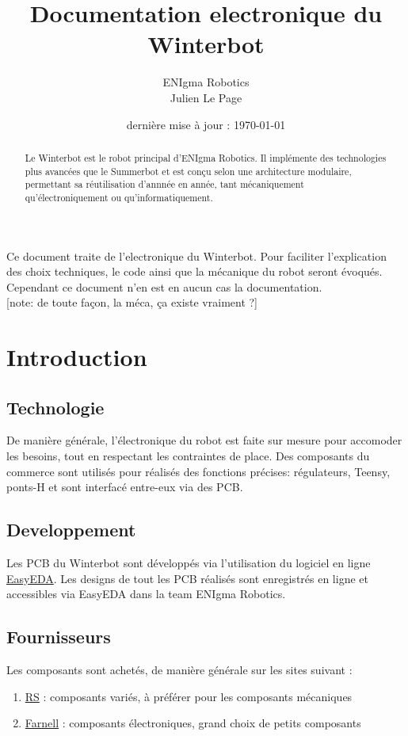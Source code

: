 \documentclass[a4paper,10pt]{refart}
\title{Documentation electronique du Winterbot}
\author{ENIgma Robotics \\ Julien Le Page}
\date{dernière mise à jour : \today}
\begin{document}
\maketitle

\begin{abstract}
	Le Winterbot est le robot principal d'ENIgma Robotics. Il implémente des
	technologies plus avancées que le Summerbot et est conçu selon une
	architecture modulaire, permettant sa réutilisation d'annnée en année, tant 
	mécaniquement qu'électroniquement ou qu'informatiquement.
\end{abstract}

Ce document traite de l'electronique du Winterbot. Pour faciliter 
l'explication des choix techniques, le code ainsi que la mécanique du robot 
seront évoqués. Cependant ce document n'en est en aucun cas la 
documentation.\\

[note: de toute façon, la méca, ça existe vraiment ?]

\tableofcontents

\newpage

\section{Introduction}

\subsection{Technologie}
	De manière générale, l'électronique du robot est faite sur mesure pour
	accomoder les besoins, tout en respectant les contraintes de place. Des
	composants du commerce sont utilisés pour réalisés des fonctions précises:
	régulateurs, Teensy, ponts-H et sont interfacé entre-eux via des PCB.

\subsection{Developpement}
	Les PCB du Winterbot sont développés via l'utilisation du logiciel en ligne
	\href{https://easyeda.com/}{EasyEDA}. Les designs de tout les PCB réalisés 
	sont enregistrés en ligne et accessibles via EasyEDA dans la team ENIgma 
	Robotics.

\subsection{Fournisseurs}
	Les composants sont achetés, de manière générale sur les sites suivant :
	\begin{enumerate}
		\item \href{https://fr.rs-online.com}{RS} : composants variés, à
			préférer pour les composants mécaniques
		\item \href{https://fr.farnell.com}{Farnell} : composants 
			électroniques, grand choix de petits composants
	\end{enumerate}
\end{document}
